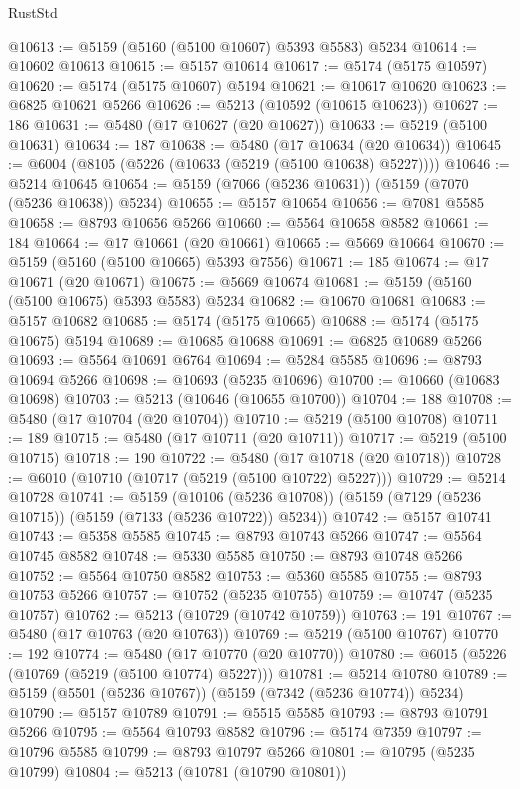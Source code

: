 \begin{lexlean}{RustStd}
\begin{coremodule}
@10613 := @5159 (@5160 (@5100 @10607) @5393 @5583) @5234
@10614 := @10602 @10613
@10615 := @5157 @10614
@10617 := @5174 (@5175 @10597)
@10620 := @5174 (@5175 @10607) @5194
@10621 := @10617 @10620
@10623 := @6825 @10621 @5266
@10626 := @5213 (@10592 (@10615 @10623))
@10627 := 186
@10631 := @5480 (@17 @10627 (@20 @10627))
@10633 := @5219 (@5100 @10631)
@10634 := 187
@10638 := @5480 (@17 @10634 (@20 @10634))
@10645 := @6004 (@8105 (@5226 (@10633 (@5219 (@5100 @10638) @5227))))
@10646 := @5214 @10645
@10654 := @5159 (@7066 (@5236 @10631)) (@5159 (@7070 (@5236 @10638)) @5234)
@10655 := @5157 @10654
@10656 := @7081 @5585
@10658 := @8793 @10656 @5266
@10660 := @5564 @10658 @8582
@10661 := 184
@10664 := @17 @10661 (@20 @10661)
@10665 := @5669 @10664
@10670 := @5159 (@5160 (@5100 @10665) @5393 @7556)
@10671 := 185
@10674 := @17 @10671 (@20 @10671)
@10675 := @5669 @10674
@10681 := @5159 (@5160 (@5100 @10675) @5393 @5583) @5234
@10682 := @10670 @10681
@10683 := @5157 @10682
@10685 := @5174 (@5175 @10665)
@10688 := @5174 (@5175 @10675) @5194
@10689 := @10685 @10688
@10691 := @6825 @10689 @5266
@10693 := @5564 @10691 @6764
@10694 := @5284 @5585
@10696 := @8793 @10694 @5266
@10698 := @10693 (@5235 @10696)
@10700 := @10660 (@10683 @10698)
@10703 := @5213 (@10646 (@10655 @10700))
@10704 := 188
@10708 := @5480 (@17 @10704 (@20 @10704))
@10710 := @5219 (@5100 @10708)
@10711 := 189
@10715 := @5480 (@17 @10711 (@20 @10711))
@10717 := @5219 (@5100 @10715)
@10718 := 190
@10722 := @5480 (@17 @10718 (@20 @10718))
@10728 := @6010 (@10710 (@10717 (@5219 (@5100 @10722) @5227)))
@10729 := @5214 @10728
@10741 := @5159
    (@10106 (@5236 @10708))
    (@5159 (@7129 (@5236 @10715)) (@5159 (@7133 (@5236 @10722)) @5234))
@10742 := @5157 @10741
@10743 := @5358 @5585
@10745 := @8793 @10743 @5266
@10747 := @5564 @10745 @8582
@10748 := @5330 @5585
@10750 := @8793 @10748 @5266
@10752 := @5564 @10750 @8582
@10753 := @5360 @5585
@10755 := @8793 @10753 @5266
@10757 := @10752 (@5235 @10755)
@10759 := @10747 (@5235 @10757)
@10762 := @5213 (@10729 (@10742 @10759))
@10763 := 191
@10767 := @5480 (@17 @10763 (@20 @10763))
@10769 := @5219 (@5100 @10767)
@10770 := 192
@10774 := @5480 (@17 @10770 (@20 @10770))
@10780 := @6015 (@5226 (@10769 (@5219 (@5100 @10774) @5227)))
@10781 := @5214 @10780
@10789 := @5159 (@5501 (@5236 @10767)) (@5159 (@7342 (@5236 @10774)) @5234)
@10790 := @5157 @10789
@10791 := @5515 @5585
@10793 := @8793 @10791 @5266
@10795 := @5564 @10793 @8582
@10796 := @5174 @7359
@10797 := @10796 @5585
@10799 := @8793 @10797 @5266
@10801 := @10795 (@5235 @10799)
@10804 := @5213 (@10781 (@10790 @10801))

\end{coremodule}
\end{lexlean}

